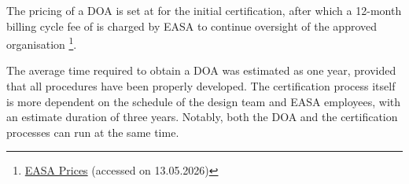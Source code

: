 The pricing of a DOA is set at  for the initial certification, after which a 12-month billing cycle fee of  is charged by EASA to continue oversight of the approved organisation  \footnote{\href{https://eur-lex.europa.eu/eli/reg_impl/2025/2347/oj}{EASA Prices} (accessed on 13.05.2026)}.


The average time required to obtain a DOA was estimated as one year, provided that all procedures have been properly developed. The certification process itself is more dependent on the schedule of the design team and EASA employees, with an estimate duration of three years. Notably, both the DOA and the certification processes can run at the same time.








